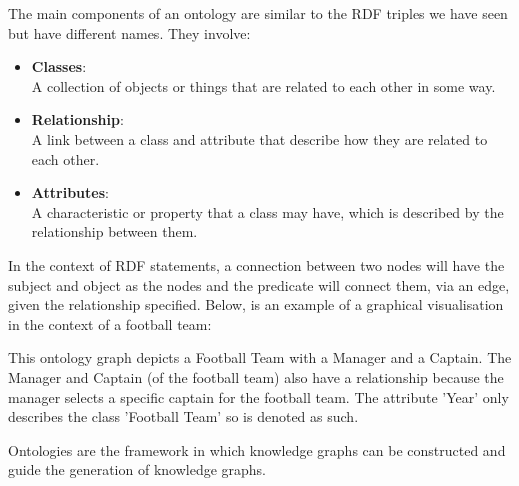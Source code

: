 The main components of an ontology are similar to the RDF triples we have seen but have different names. They involve:
\begin{itemize}
\item \textbf{Classes}: \\
A collection of objects or things that are related to each other in some way.

\item \textbf{Relationship}: \\
A link between a class and attribute that describe how they are related to each other. 

\item \textbf{Attributes}:\\ 
A characteristic or property that a class may have, which is described by the relationship between them.

\end{itemize}

In the context of RDF statements, a connection between two nodes will have the subject and object as the nodes and the predicate will connect them, via an edge, given the relationship specified. Below, is an example of a graphical visualisation in the context of a football team:

 \bigskip
\begin{center}
\end{center}

This ontology graph depicts a Football Team with a Manager and a Captain. The Manager and Captain (of the football team) also have a relationship because the manager selects a specific captain for the football team. The attribute 'Year' only describes the class 'Football Team' so is denoted as such.

Ontologies are the framework in which knowledge graphs can be constructed and guide the generation of knowledge graphs. 

